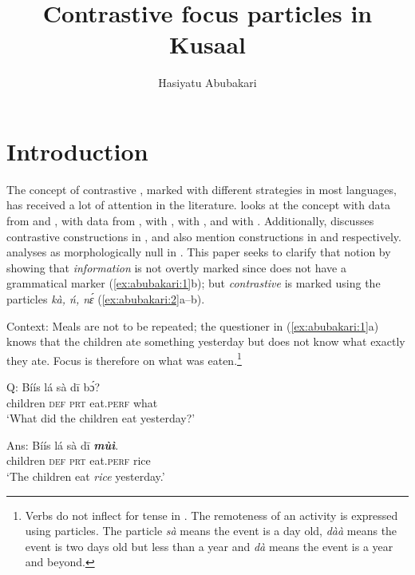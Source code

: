 \documentclass[output=paper,modfonts,nonflat,
 hidelinks
]{langsci/langscibook}
\author{Hasiyatu Abubakari\affiliation{University of Vienna, Austria}}
\title{Contrastive focus particles in Kusaal}
\begin{document}
\maketitle

\section{Introduction}
The concept of contrastive , marked with different strategies in most languages, has received a lot of attention in the literature. \citet{ÉKiss1998} looks at the concept with data from  and , \citet{horn1981} with data from , \citet{szabolcsi1981} with , \citet{hartmann2007} with , and \citet{duah2015} with . Additionally, \citet{hudu2012} discusses contrastive  constructions in , \citet{hiraiwa2005} and \citet{hiraiwabodomo2008} also mention  constructions in  and  respectively. \citet{Abubakari2011} analyses  as morphologically null in . This paper seeks to clarify that notion by showing that \textit{information}  is not overtly marked since  does not have a grammatical  marker (\ref{ex:abubakari:1}b); but \textit{contrastive}  is marked using the particles \textit{kà, ń, nɛ́} (\ref{ex:abubakari:2}a--b). 

Context: Meals are not to be repeated; the questioner in (\ref{ex:abubakari:1}a) knows that the children ate something yesterday but does not know what exactly they ate. Focus is therefore on what was eaten.\footnote{Verbs do not inflect for tense in . The remoteness of an activity is expressed using particles. The particle \textit{sà} means the event is a day old, \textit{dàà} means the event is two days old but less than a year and \textit{dà} means the event is a year and beyond.}

 
\ea\label{ex:abubakari:1}
\ea\label{ex:abubakari:1a}
Q: \gll Bíís    lá  sà dī    bɔ́?\\                 
children  \textsc{def}  \textsc{prt}  eat.\textsc{perf}  what\\                     
\glt ‘What did the children eat yesterday?’    

\ex\label{ex:abubakari:1b}
Ans: \gll Bíís    lá  sà  dī \textbf{\textit{mùì}}.\\
children    \textsc{def}  \textsc{prt}  eat.\textsc{perf}  rice\\
\glt ‘The children eat \textit{rice} yesterday.’  
 \z
 \z
 
\end{document}
